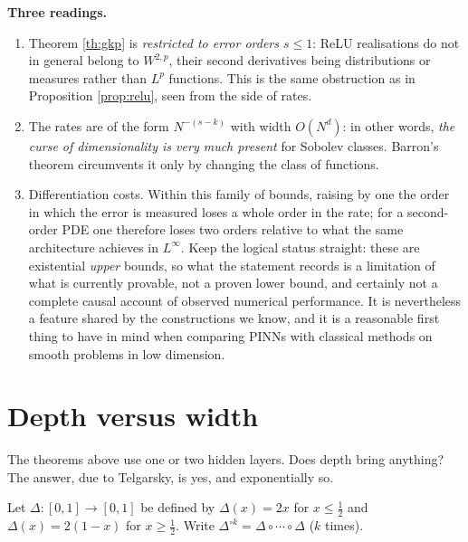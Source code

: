 \documentclass[11pt,a4paper]{article}
\begin{document}
\begin{keybox}
\textbf{Three readings.}
\begin{enumerate}[label=(\alph*)]
\item Theorem \ref{th:gkp} is \emph{restricted to error orders $s \le 1$}: ReLU realisations do not
in general belong to $W^{2,p}$, their second derivatives being distributions or measures rather than
$L^p$ functions. This is the same obstruction as in Proposition \ref{prop:relu}, seen from the side
of rates.
\item The rates are of the form $N^{-(s-k)}$ with width $O(N^d)$: in other words,
\emph{the curse of dimensionality is very much present} for Sobolev classes. Barron's theorem
circumvents it only by changing the class of functions.
\item Differentiation costs. Within this family of bounds, raising by one the order in which the
error is measured loses a whole order in the rate; for a second-order PDE one therefore loses two
orders relative to what the same architecture achieves in $L^\infty$. Keep the logical status
straight: these are existential \emph{upper} bounds, so what the statement records is a limitation
of what is currently provable, not a proven lower bound, and certainly not a complete causal account
of observed numerical performance. It is nevertheless a feature shared by the constructions we know,
and it is a reasonable first thing to have in mind when comparing PINNs with classical methods on
smooth problems in low dimension.
\end{enumerate}
\end{keybox}

\section{Depth versus width}

The theorems above use one or two hidden layers. Does depth bring anything? The answer, due to
Telgarsky, is yes, and exponentially so.

\begin{definition}
Let $\Delta : [0,1] \to [0,1]$ be defined by $\Delta(x) = 2x$ for $x \le \tfrac12$ and
$\Delta(x) = 2(1-x)$ for $x \ge \tfrac12$. Write
$\Delta^{\circ k} = \Delta \circ \cdots \circ \Delta$ ($k$ times).
\end{definition}
\end{document}
